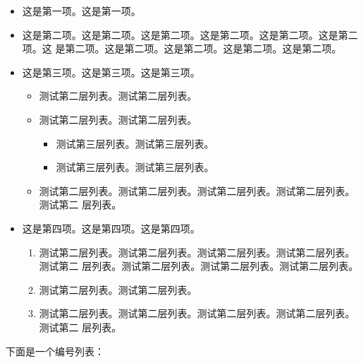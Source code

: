\begin{itemize}
    \item 这是第一项。这是第一项。
    \item 这是第二项。这是第二项。这是第二项。这是第二项。这是第二项。这是第二项。这
    是第二项。这是第二项。这是第二项。这是第二项。这是第二项。
    \item 这是第三项。这是第三项。这是第三项。
    \begin{itemize}
        \item 测试第二层列表。测试第二层列表。
        \item 测试第二层列表。测试第二层列表。
        \begin{itemize}
            \item 测试第三层列表。测试第三层列表。
            \item 测试第三层列表。测试第三层列表。
        \end{itemize}
        \item 测试第二层列表。测试第二层列表。测试第二层列表。测试第二层列表。测试第二
        层列表。
    \end{itemize}
    \item 这是第四项。这是第四项。这是第四项。
    \begin{enumerate}
        \item 测试第二层列表。测试第二层列表。测试第二层列表。测试第二层列表。测试第二
        层列表。测试第二层列表。测试第二层列表。测试第二层列表。
        \item 测试第二层列表。测试第二层列表。
        \item 测试第二层列表。测试第二层列表。测试第二层列表。测试第二层列表。测试第二
        层列表。
    \end{enumerate}
\end{itemize}

下面是一个编号列表：


